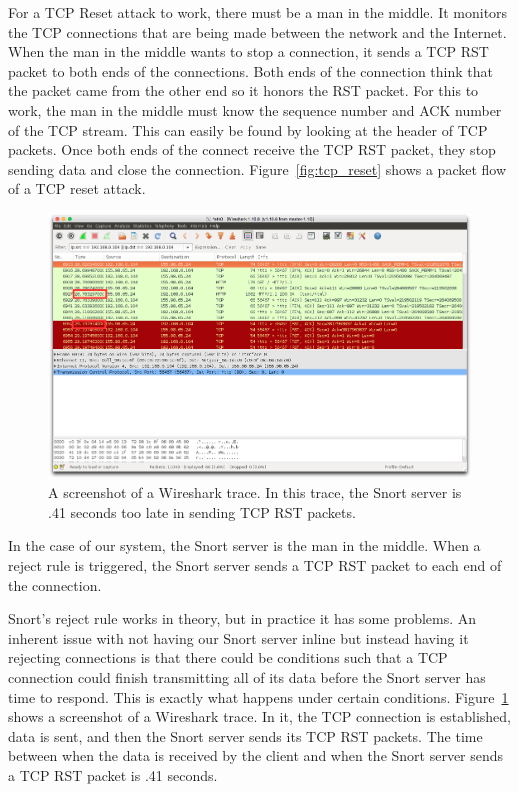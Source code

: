 For a TCP Reset attack to work, there must be a man in the middle. It monitors
the TCP connections that are being made between the network and the Internet.
When the man in the middle wants to stop a connection, it sends a TCP RST packet
to both ends of the connections. Both ends of the connection think that the
packet came from the other end so it honors the RST packet. For this to work,
the man in the middle must know the sequence number and ACK number of the TCP
stream. This can easily be found by looking at the header of TCP packets. Once
both ends of the connect receive the TCP RST packet, they stop sending data and
close the connection. Figure~\ref{fig:tcp_reset} shows a packet flow of a TCP
reset attack.

\begin{figure}[!hbtp]
    \centering
    \includegraphics[width=2\columnwidth]{figures/snort_slow}
    \caption{A screenshot of a Wireshark trace. In this trace, the Snort
    server is .41 seconds too late in sending TCP RST packets.}
    \label{fig:snort_slow}
\end{figure}

In the case of our system, the Snort server is the man in the middle. When a
reject rule is triggered, the Snort server sends a TCP RST packet to each end
of the connection.

Snort's reject rule works in theory, but in practice it has some problems.
%
An inherent issue with not having our Snort server inline but instead having
it rejecting connections is that there could be conditions such that a TCP
connection could finish transmitting all of its data before the Snort server
has time to respond.
%
This is exactly what happens under certain conditions.
%
Figure~\ref{fig:snort_slow} shows a screenshot of a Wireshark trace.
%
In it, the TCP connection is established, data is sent, and then the Snort
server sends its TCP RST packets.
%
The time between when the data is received by the client and when the Snort
server sends a TCP RST packet is .41 seconds.

